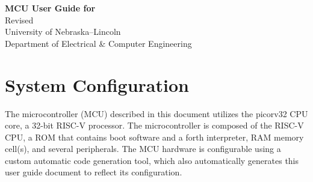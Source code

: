 \documentclass[11pt,pdftex,portrait,letterpaper]{article}
\begin{document}
	
\vspace*{30ex}
\begin{center}
	\textbf{MCU User Guide for \AsicNameForUserGuide} \\
	\vspace{2ex}
	Revised \RevisionDateFull \\
	\vspace{8ex}
	University of Nebraska--Lincoln \\
	Department of Electrical \& Computer Engineering \\
	\vspace{4ex}
\end{center}

\newpage

\tableofcontents
\newpage



\section{System Configuration} \label{s:config}
The microcontroller (MCU) described in this document utilizes the picorv32 CPU core, a 32-bit RISC-V processor. The microcontroller is composed of the RISC-V CPU, a ROM that contains boot software and a forth interpreter, RAM memory cell(s), and several peripherals. The MCU hardware is configurable using a custom automatic code generation tool, which also automatically generates this user guide document to reflect its configuration. %

\end{document}
